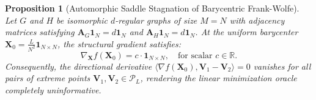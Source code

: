 \documentclass[conference]{IEEEtran}
\newtheorem{proposition}{Proposition}
\begin{document}
\begin{proposition}[Automorphic Saddle Stagnation of Barycentric Frank-Wolfe]
\label{prop:saddle_stagnation}
Let $G$ and $H$ be isomorphic $d$-regular graphs of size $M=N$ with adjacency matrices satisfying $\mathbf{A}_G \mathbf{1}_N = d \mathbf{1}_N$ and $\mathbf{A}_H \mathbf{1}_N = d \mathbf{1}_N$. At the uniform barycenter $\mathbf{X}_0 = \frac{L}{N^2}\mathbf{1}_{N \times N}$, the structural gradient satisfies:
\begin{equation}
\nabla_{\mathbf{X}} f(\mathbf{X}_0) = c \cdot \mathbf{1}_{N \times N}, \quad \text{for scalar } c \in \mathbb{R}.
\label{eq:uniform_gradient}
\end{equation}
Consequently, the directional derivative $\langle \nabla f(\mathbf{X}_0), \mathbf{V}_1 - \mathbf{V}_2 \rangle = 0$ vanishes for all pairs of extreme points $\mathbf{V}_1, \mathbf{V}_2 \in \mathcal{P}_L$, rendering the linear minimization oracle completely uninformative.
\end{proposition}
\end{document}
